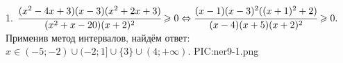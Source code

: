 1. $\cfrac{(x^2-4x+3)(x-3)(x^2+2x+3)}{(x^2+x-20)(x+2)^2}\geqslant0 \Leftrightarrow \cfrac{(x-1)(x-3)^2((x+1)^2+2)}{(x-4)(x+5)(x+2)^2}\geqslant0.$ Применив метод интервалов, найдём ответ: $x\in(-5;-2)\cup(-2;1]\cup\{3\}\cup(4;+\infty).$
{{PIC:ner9-1.png}}\\
